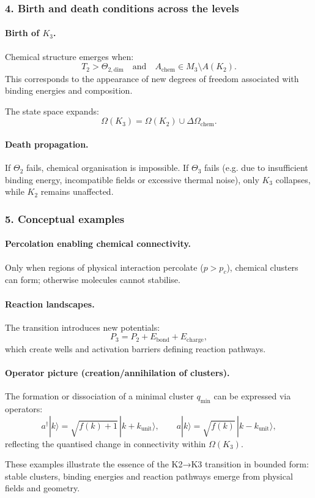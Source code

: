 \subsubsection{4. Birth and death conditions across the levels}

\paragraph{Birth of \texorpdfstring{$K_3$}{K_3}.}
Chemical structure emerges when:
\[
T_2 > \Theta_{2,\mathrm{dim}}
\quad \text{and} \quad
A_{\mathrm{chem}} \in M_3 \setminus A(K_2).
\]
This corresponds to the appearance of new degrees of freedom associated
with binding energies and composition.

The state space expands:
\[
\Omega(K_3) = \Omega(K_2) \cup \Delta\Omega_{\mathrm{chem}}.
\]

\paragraph{Death propagation.}
If $\Theta_2$ fails, chemical organisation is impossible.
If $\Theta_3$ fails (e.g. due to insufficient binding energy,
incompatible fields or excessive thermal noise), only $K_3$ collapses,
while $K_2$ remains unaffected.

\subsubsection{5. Conceptual examples}

\paragraph{Percolation enabling chemical connectivity.}
Only when regions of physical interaction percolate ($p>p_c$), chemical
clusters can form; otherwise molecules cannot stabilise.

\paragraph{Reaction landscapes.}
The transition introduces new potentials:
\[
P_3 = P_2 + E_{\mathrm{bond}} + E_{\mathrm{charge}},
\]
which create wells and activation barriers defining reaction pathways.

\paragraph{Operator picture (creation/annihilation of clusters).}
The formation or dissociation of a minimal cluster $q_{\mathrm{min}}$ can be
expressed via operators:
\[
a^{\dagger} |k\rangle = \sqrt{f(k)+1}\,|k+k_{\mathrm{unit}}\rangle,
\qquad
a |k\rangle = \sqrt{f(k)}\,|k-k_{\mathrm{unit}}\rangle,
\]
reflecting the quantised change in connectivity within $\Omega(K_3)$.

These examples illustrate the essence of the K2→K3 transition in bounded
form: stable clusters, binding energies and reaction pathways emerge from
physical fields and geometry.

